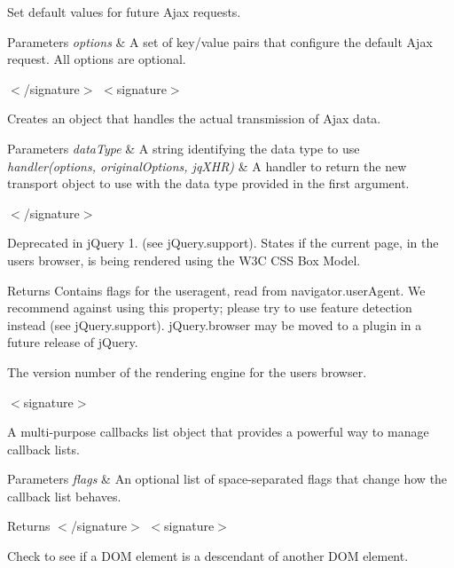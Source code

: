 Set default values for future Ajax requests.


\begin{DoxyParams}{Parameters}
{\em options} & A set of key/value pairs that configure the default Ajax request. All options are optional.\\
\hline
\end{DoxyParams}
$<$/signature$>$ $<$signature$>$ 

Creates an object that handles the actual transmission of Ajax data.


\begin{DoxyParams}{Parameters}
{\em data\+Type} & A string identifying the data type to use\\
\hline
{\em handler(options, original\+Options, jq\+X\+H\+R)} & A handler to return the new transport object to use with the data type provided in the first argument.\\
\hline
\end{DoxyParams}
$<$/signature$>$ 

Deprecated in j\+Query 1. (see j\+Query.\+support). States if the current page, in the user\textquotesingle{}s browser, is being rendered using the W3C C\+SS Box Model.

\begin{DoxyReturn}{Returns}
Contains flags for the useragent, read from navigator.\+user\+Agent. We recommend against using this property; please try to use feature detection instead (see j\+Query.\+support). j\+Query.\+browser may be moved to a plugin in a future release of j\+Query.

The version number of the rendering engine for the user\textquotesingle{}s browser.

$<$signature$>$ 

A multi-\/purpose callbacks list object that provides a powerful way to manage callback lists.
\end{DoxyReturn}

\begin{DoxyParams}{Parameters}
{\em flags} & An optional list of space-\/separated flags that change how the callback list behaves.\\
\hline
\end{DoxyParams}
\begin{DoxyReturn}{Returns}
$<$/signature$>$ $<$signature$>$ 

Check to see if a D\+OM element is a descendant of another D\+OM element.
\end{DoxyReturn}

